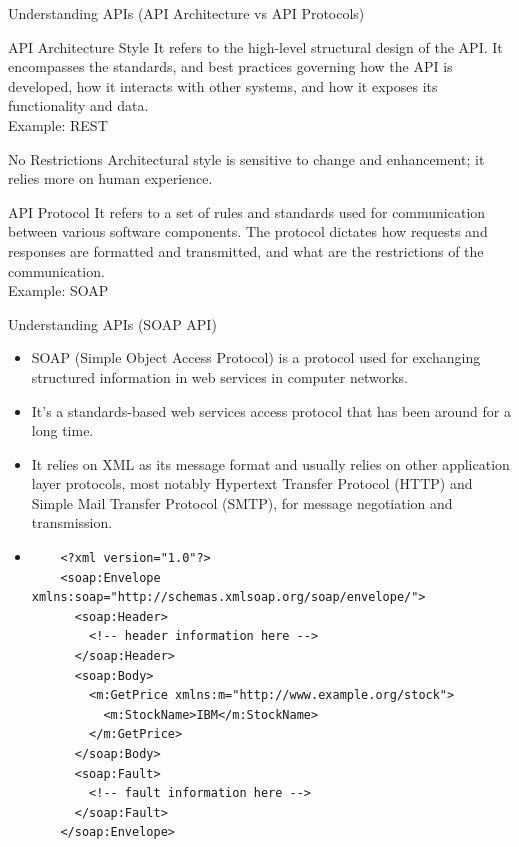 \documentclass{beamer}
\begin{document}
\begin{frame}[t]{Understanding APIs \small (API Architecture vs API Protocols)}
  \begin{block}{API Architecture Style}  
   \scriptsize It refers to the high-level structural design of the API. It encompasses the standards, and best practices governing how the API is developed, how it interacts with other systems, and how it exposes its functionality and data.\\
   \color{teal} Example: REST
  \end{block}
  
  \begin{alertblock}{No Restrictions}
    \scriptsize Architectural style is sensitive to change and enhancement; it relies more on human experience.
  \end{alertblock}
  
  
  \begin{block}{API Protocol}
    \scriptsize It refers to a set of rules and standards used for communication between various software components. The protocol dictates how requests and responses are formatted and transmitted, and what are the restrictions of the communication.\\
    \color{teal} Example: SOAP
  \end{block}
\end{frame}

\begin{frame}[fragile,t]{Understanding APIs \small (SOAP API)}
  
  \begin{itemize}
    \scriptsize
    \item<1-> SOAP (Simple Object Access Protocol) is a protocol used for exchanging structured information in web services in computer networks. 
    \item<2-> It's a standards-based web services access protocol that has been around for a long time. 
	\item<3-> It relies on XML as its message format and usually relies on other application layer protocols, most notably Hypertext Transfer Protocol (HTTP) and Simple Mail Transfer Protocol (SMTP), for message negotiation and transmission.
	\item<4->[] 
	\tiny 
	\begin{lstlisting}
    <?xml version="1.0"?>
    <soap:Envelope xmlns:soap="http://schemas.xmlsoap.org/soap/envelope/">
      <soap:Header>
        <!-- header information here -->
      </soap:Header>
      <soap:Body>
        <m:GetPrice xmlns:m="http://www.example.org/stock">
          <m:StockName>IBM</m:StockName>
        </m:GetPrice>
      </soap:Body>
      <soap:Fault>
        <!-- fault information here -->
      </soap:Fault>
    </soap:Envelope>
    \end{lstlisting}

  \end{itemize}
  
\end{frame}
\end{document}
